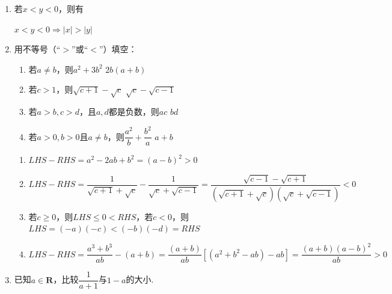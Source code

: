 \begin{enumerate}
\begin{enumerate}
\begin{jieda}
\begin{enumerate}[A.]
                （换元更好）
                \item $c > d \Longrightarrow -d > -c$，故$a - d > b - c$
                \item $a > b > 0, c>d>0 \Longrightarrow ac - bd > 0 \Longrightarrow \dfrac{ac-bd}{cd} > 0 \Longrightarrow \dfrac{a}{d} - \dfrac{b}{c} > 0$
                \item 反例：$a = 10, b = 1, c = \dfrac{1}{2}, d = 1$
            \end{enumerate}
        \end{jieda}
        \item 若$x < y < 0$，则有
        \begin{jieda}
            $x < y < 0 \Longrightarrow |x| > |y|$
        \end{jieda}
        \item 用不等号（“$>$”或“$<$”）填空：
        \begin{enumerate}
            \item 若$a \neq b$，则$a^2+3b^2$ \blkda{>} $2b(a+b)$
            \item 若$c > 1$，则$\sqrt{c+1} - \sqrt{c}$ \blkda{<} $\sqrt{c} - \sqrt{c-1}$
            \item 若$a > b, c > d$，且$a, d$都是负数，则$ac$ \blkda{<} $bd$
            \item 若$a > 0, b > 0$且$a \neq b$，则$\dfrac{a^2}{b} + \dfrac{b^2}{a}$\blkda{>} $a+b$
        \end{enumerate}
        \begin{jieda}
            \begin{enumerate}
                \item $LHS - RHS = a^2 - 2ab + b^2 = (a-b)^2 > 0$
                \item $LHS - RHS = \dfrac{1}{\sqrt{c+1} + \sqrt{c}} - \dfrac{1}{\sqrt{c} + \sqrt{c-1}} = \dfrac{\sqrt{c-1} - \sqrt{c+1}}{(\sqrt{c+1} + \sqrt{c})(\sqrt{c} + \sqrt{c-1})} < 0$
                \item 若$c \geq 0$，则$LHS \leq 0 < RHS$，若$c < 0$，则$LHS = (-a)(-c) < (-b)(-d) = RHS$
                \item $LHS - RHS = \dfrac{a^3+b^3}{ab} - (a+b) = \dfrac{(a+b)}{ab}[(a^2+b^2-ab) - ab]  = \dfrac{(a+b)(a-b)^2}{ab} > 0$
            \end{enumerate}
        \end{jieda}
        \item 已知$a \in \mathbf{R}$，比较$\dfrac{1}{a+1}$与$1-a$的大小.

\end{enumerate}
\end{enumerate}
